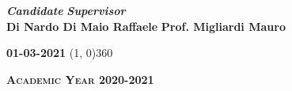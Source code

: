\begin{titlepage}
\vspace{3cm}
\begin{normalsize}
\begin{flushleft}
  
  \hspace{62pt} \textbf{\textit{Candidate}} \hspace{125pt} \textbf{\textit{Supervisor}}\\
  \vspace{5pt}
  \hspace{22pt} {\textbf{Di Nardo Di Maio Raffaele}} \hspace{33pt} {\textbf{Prof. Migliardi Mauro}}\\
\end{flushleft}
\end{normalsize}

\vfill
\begin{center}
\textsc{\textbf{01-03-2021}}
\hspace{-0.2cm}
\line(1, 0){360}

\textsc{\textbf{Academic Year 2020-2021}}
\end{center}
\end{titlepage}
\cleardoublepage %
\thispagestyle{empty}
\addtolength{\oddsidemargin}{+0.7cm}